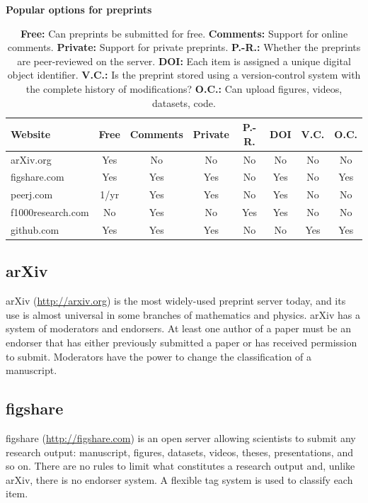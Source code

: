 \documentclass[letterpaper]{article}
\begin{document}
\begin{table}[!ht]
  \caption{\bf{Popular options for preprints}}
  \begin{tabular}{|l|ccccccc|}
  \hline
  Website               & Free & Comments & Private & P.-R. & DOI & V.C.& O.C.\\
  \hline
  arXiv.org             & Yes  & No       & No      & No    & No  & No  & No\\
  figshare.com          & Yes  & Yes      & Yes     & No    & Yes & No  & Yes\\
  peerj.com             & 1/yr & Yes      & Yes     & No    & Yes & No  & No\\
  f1000research.com     & No   & Yes      & No      & Yes   & Yes & No  & No\\
  github.com            & Yes  & Yes      & Yes     & No    & No  & Yes & Yes\\
  \hline
  \end{tabular}
  \caption{
    \textbf{Free:} Can preprints be submitted for free.
    \textbf{Comments:} Support for online comments.
    \textbf{Private:} Support for private preprints.
    \textbf{P.-R.:} Whether the preprints are peer-reviewed on the server.
    \textbf{DOI:} Each item is assigned a unique digital object identifier.
    \textbf{V.C.:} Is the preprint stored using a version-control system with the complete history of modifications?
    \textbf{O.C.:} Can upload figures, videos, datasets, code.
  }
  \label{table:options}
\end{table}

\subsection{arXiv}

arXiv (\href{http://arxiv.org}{http://arxiv.org}) is the most widely-used preprint server today,
and its use is almost universal in some branches of mathematics and physics.
arXiv has a system of moderators and endorsers. At least one author of a paper
must be an endorser that has either previously submitted a paper or has received
permission to submit.  Moderators have the power to change the classification of
a manuscript.

\subsection{figshare}

figshare (\href{http://figshare.com}{http://figshare.com}) is an open server
allowing scientists to submit any research output: manuscript, figures,
datasets, videos, theses, presentations, and so on. There are no rules to limit
what constitutes a research output and, unlike arXiv, there is no endorser
system. A flexible tag system is used to classify each item.
\end{document}
